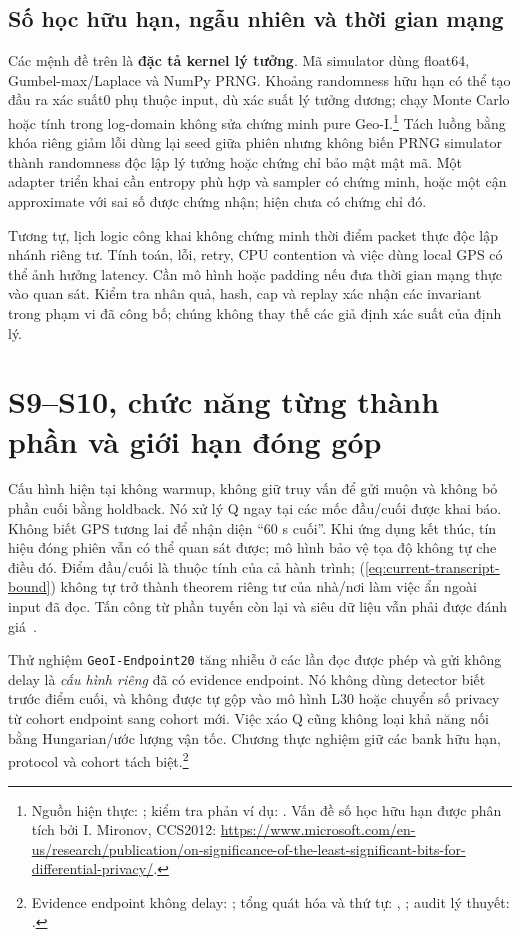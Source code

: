\subsection{Số học hữu hạn, ngẫu nhiên và thời gian mạng}

Các mệnh đề trên là \textbf{đặc tả kernel lý tưởng}. Mã simulator dùng float64, Gumbel-max/Laplace và NumPy PRNG. Khoảng randomness hữu hạn có thể tạo đầu ra xác suất0 phụ thuộc input, dù xác suất lý tưởng dương; chạy Monte Carlo hoặc tính trong log-domain không sửa chứng minh pure Geo-I.\footnote{Nguồn hiện thực: ; kiểm tra phản ví dụ: . Vấn đề số học hữu hạn được phân tích bởi I. Mironov, CCS2012: \url{https://www.microsoft.com/en-us/research/publication/on-significance-of-the-least-significant-bits-for-differential-privacy/}.} Tách luồng bằng khóa riêng giảm lỗi dùng lại seed giữa phiên nhưng không biến PRNG simulator thành randomness độc lập lý tưởng hoặc chứng chỉ bảo mật mật mã. Một adapter triển khai cần entropy phù hợp và sampler có chứng minh, hoặc một cận approximate với sai số được chứng nhận; hiện chưa có chứng chỉ đó.

Tương tự, lịch logic công khai không chứng minh thời điểm packet thực độc lập nhánh riêng tư. Tính toán, lỗi, retry, CPU contention và việc dùng local GPS có thể ảnh hưởng latency. Cần mô hình hoặc padding nếu đưa thời gian mạng thực vào quan sát. Kiểm tra nhân quả, hash, cap và replay xác nhận các invariant trong phạm vi đã công bố; chúng không thay thế các giả định xác suất của định lý.

\section{S9--S10, chức năng từng thành phần và giới hạn đóng góp}
\label{sec:current-endpoints-contribution}

Cấu hình hiện tại không warmup, không giữ truy vấn để gửi muộn và không bỏ phần cuối bằng holdback. Nó xử lý Q ngay tại các mốc đầu/cuối được khai báo. Không biết GPS tương lai để nhận diện ``60 s cuối''. Khi ứng dụng kết thúc, tín hiệu đóng phiên vẫn có thể quan sát được; mô hình bảo vệ tọa độ không tự che điều đó. Điểm đầu/cuối là thuộc tính của cả hành trình; (\ref{eq:current-transcript-bound}) không tự trở thành theorem riêng tư của nhà/nơi làm việc ẩn ngoài input đã đọc. Tấn công từ phần tuyến còn lại và siêu dữ liệu vẫn phải được đánh giá~\cite{dhondt2022endpoint}.

Thử nghiệm \texttt{GeoI-Endpoint20} tăng nhiễu ở các lần đọc được phép và gửi không delay là \emph{cấu hình riêng} đã có evidence endpoint. Nó không dùng detector biết trước điểm cuối, và không được tự gộp vào mô hình L30 hoặc chuyển số privacy từ cohort endpoint sang cohort mới. Việc xáo Q cũng không loại khả năng nối bằng Hungarian/ước lượng vận tốc. Chương thực nghiệm giữ các bank hữu hạn, protocol và cohort tách biệt.\footnote{Evidence endpoint không delay: ; tổng quát hóa và thứ tự: , ; audit lý thuyết: .}

